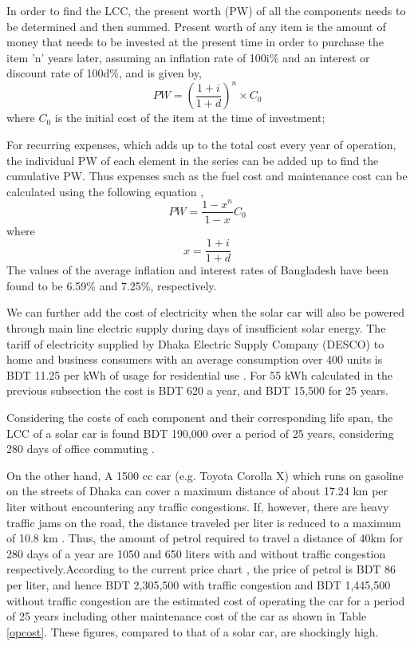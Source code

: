 \documentclass[journal]{IEEEtran/IEEEtran}
\begin{document}
	
	
	In order to find the LCC, the present worth (PW) of all the components needs to be determined and then summed. Present worth of any item is the amount of money that needs to be invested at the present time in order to purchase the item 'n' years later, assuming an inflation rate of 100i\% and an interest or discount rate of 100d\%, and is given by,
	\begin{equation}
	\label{presentworth}
	PW = \left(\frac{1+i}{1+d}\right)^n \times C_0
	\end{equation}
	where $C_0$ is the initial cost of the item at the time of investment\cite{roger};
	
	For recurring expenses, which adds up to the total cost every year of operation, the individual PW of each element in the series can be added up to find the cumulative PW. Thus expenses such as the fuel cost and maintenance cost can be calculated using the following equation \cite{roger},
	\begin{equation}
	\label{realpw}
	PW = \frac{1-x^n}{1-x}C_0
	\end{equation}
	where
	\begin{equation}
	\label{x}
	x = \frac{1+i}{1+d}
	\end{equation}
	The values of the average inflation and interest rates of
	Bangladesh have been found to be 6.59\% and 7.25\%,
	respectively.
	
	
	We can further add the cost of electricity when the solar car will also be powered through main line electric supply during days of insufficient solar energy. The tariff of electricity supplied by Dhaka Electric Supply Company (DESCO) to home and business consumers with an average consumption over 400 units is BDT 11.25 per kWh of usage for residential use \cite{desco}. For 55 kWh calculated in the previous subsection the cost is BDT 620 a year, and BDT 15,500 for 25 years.
	
	
	Considering the costs of each component and their corresponding life span, the LCC of a solar car is found BDT 190,000 over a period of 25 years, considering 280 days of office commuting \cite{solar_car}.
	
	
	On the other hand, A 1500 cc car (e.g. Toyota Corolla X) which runs on gasoline on the streets of Dhaka can cover a maximum distance of about 17.24 km per liter without encountering any traffic congestions. If, however, there
	are heavy traffic jams on the road, the distance traveled per liter is reduced to a maximum of 10.8 km \cite{toyota}. Thus, the amount of petrol required to travel a distance of 40km for 280 days of a year are 1050 and 650 liters with and without traffic congestion respectively.According to the current price chart \cite{petrol}, the price of petrol is BDT 86 per liter, and hence BDT 2,305,500 with traffic congestion and BDT 1,445,500 without traffic congestion are the estimated cost of operating the car for a period of 25 years including other maintenance cost of the car as shown in Table \ref{opcost}. These figures, compared to that of a solar car, are shockingly high. 
	
\end{document}
